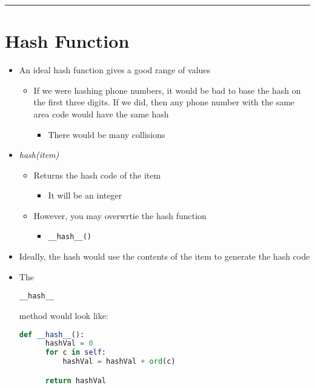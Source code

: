 \documentclass{article}
\begin{document}
\begin{center}
  \rule{0.5\textwidth}{0.4pt}
\end{center}

\section{Hash Function}
\begin{itemize}
  \item{An ideal hash function gives a good range of values}
  \begin{itemize}
    \item{If we were hashing phone numbers, it would be bad to base the hash on the first three digits. If we did, then any phone number with the same area code would have the same hash}
    \begin{itemize}
      \item{There would be many collisions}
    \end{itemize}
  \end{itemize}
  \item{\textit{hash(item)}}
  \begin{itemize}
    \item{Returns the hash code of the item}
    \begin{itemize}
      \item{It will be an integer}
    \end{itemize}
    \item{However, you may overwrtie the hash function}
    \begin{itemize}
      \item{\begin{verbatim}__hash__()\end{verbatim}}
    \end{itemize}
  \end{itemize}
  \item{Ideally, the hash would use the contents of the item to generate the hash code}
  \item{The \begin{verbatim}__hash__\end{verbatim} method would look like:}
  \begin{lstlisting}[language=Python, frame=single]
  def __hash__():
      hashVal = 0
      for c in self:
          hashVal = hashVal + ord(c)

      return hashVal
  \end{lstlisting}
\end{itemize}
\end{document}
